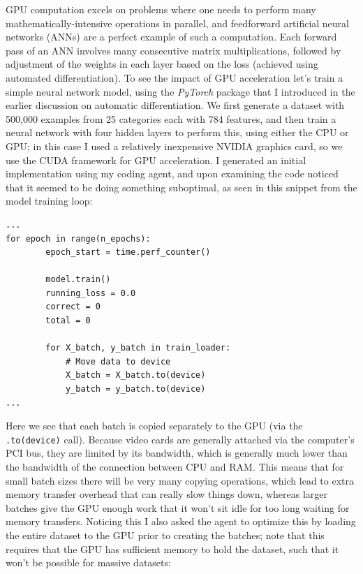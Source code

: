 GPU computation excels on problems where one needs to perform many mathematically-intensive operations in parallel, and feedforward artificial neural networks (ANNs) are a perfect example of such a computation.  Each forward pass of an ANN involves many consecutive matrix multiplications, followed by adjustment of the weights in each layer based on the loss (achieved using automated differentiation).  To see the impact of GPU acceleration let's train a simple neural network model, using the \textit{PyTorch} package that I introduced in the earlier discussion on automatic differentiation. We first generate a dataset with 500,000 examples from 25 categories each with 784 features, and then train a neural network with four hidden layers to perform this, using either the CPU or GPU; in this case I used a relatively inexpensive NVIDIA graphics card, so we use the CUDA framework for GPU acceleration.  I generated an initial implementation using my coding agent, and upon examining the code noticed that it seemed to be doing something suboptimal, as seen in this snippet from the model training loop:

\begin{lstlisting}[style=Python]
...
for epoch in range(n_epochs):
        epoch_start = time.perf_counter()
        
        model.train()
        running_loss = 0.0
        correct = 0
        total = 0
        
        for X_batch, y_batch in train_loader:
            # Move data to device
            X_batch = X_batch.to(device)
            y_batch = y_batch.to(device)
...
\end{lstlisting}

Here we see that each batch is copied separately to the GPU (via the \texttt{.to(device)} call).  Because video cards are generally attached via the computer's PCI bus, they are limited by its bandwidth, which is generally much lower than the bandwidth of the connection between CPU and RAM. This means that for small batch sizes there will be very many copying operations, which lead to extra memory transfer overhead that can really slow things down, whereas larger batches give the GPU enough work that it won't sit idle for too long waiting for memory transfers.  Noticing this I also asked the agent to optimize this by loading the entire dataset to the GPU prior to creating the batches; note that this requires that the GPU has sufficient memory to hold the dataset, such that it won't be possible for massive datasets:

